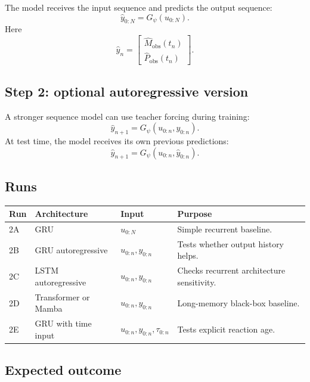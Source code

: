 \documentclass[11pt]{article}
\newcommand{\obs}{\mathrm{obs}}
\begin{document}
The model receives the input sequence and predicts the output sequence:
\begin{equation}
    \widehat{y}_{0:N}=G_\psi(u_{0:N}).
\end{equation}
Here
\begin{equation}
    \widehat{y}_n=
    \begin{bmatrix}
        \widehat{M}_{\obs}(t_n)\\
        \widehat{P}_{\obs}(t_n)
    \end{bmatrix}.
\end{equation}

\subsection{Step 2: optional autoregressive version}

A stronger sequence model can use teacher forcing during training:
\begin{equation}
    \widehat{y}_{n+1}=G_\psi(u_{0:n},y_{0:n}).
\end{equation}
At test time, the model receives its own previous predictions:
\begin{equation}
    \widehat{y}_{n+1}=G_\psi(u_{0:n},\widehat{y}_{0:n}).
\end{equation}

\subsection{Runs}

\begin{center}
\begin{tabularx}{\textwidth}{lllX}
\toprule
Run & Architecture & Input & Purpose \\
\midrule
2A & GRU & $u_{0:N}$ & Simple recurrent baseline. \\
2B & GRU autoregressive & $u_{0:n},y_{0:n}$ & Tests whether output history helps. \\
2C & LSTM autoregressive & $u_{0:n},y_{0:n}$ & Checks recurrent architecture sensitivity. \\
2D & Transformer or Mamba & $u_{0:n},y_{0:n}$ & Long-memory black-box baseline. \\
2E & GRU with time input & $u_{0:n},y_{0:n},\tau_{0:n}$ & Tests explicit reaction age. \\
\bottomrule
\end{tabularx}
\end{center}

\subsection{Expected outcome}
\end{document}

